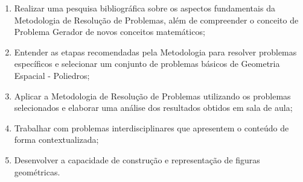 \begin{enumerate}


    \item Realizar uma pesquisa bibliográfica sobre os aspectos fundamentais da Metodologia de Resolução de Problemas, além de compreender o conceito de Problema Gerador de novos conceitos matemáticos;
    \item Entender as etapas recomendadas pela Metodologia para resolver problemas específicos e selecionar um conjunto de problemas básicos de Geometria Espacial - Poliedros;
    \item Aplicar a Metodologia de Resolução de Problemas utilizando os problemas selecionados e elaborar uma análise dos resultados obtidos em sala de aula;
    \item Trabalhar com problemas interdisciplinares que apresentem o conteúdo de forma contextualizada;
    \item Desenvolver a capacidade de construção e representação de figuras geométricas.


\end{enumerate}
